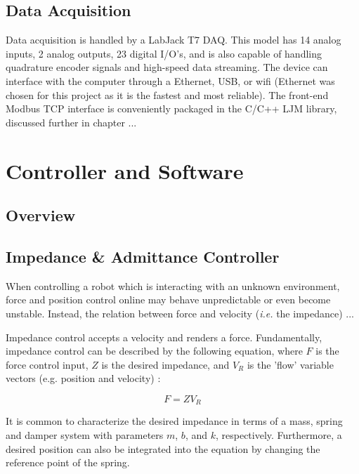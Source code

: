 \documentclass[12pt]{report}
\begin{document}
	\section{Data Acquisition} 

	Data acquisition is handled by a LabJack T7 DAQ. This model has 14 analog inputs, 2 analog outputs, 23 digital I/O's, and is also capable of handling quadrature encoder signals and high-speed data streaming. The device can interface with the computer through a Ethernet, USB, or wifi (Ethernet was chosen for this project as it is the fastest and most reliable). The front-end Modbus TCP interface is conveniently packaged in the C/C++ LJM library, discussed further in chapter ... 

\chapter{Controller and Software}

	\section{Overview}
	\section{Impedance \& Admittance Controller}

%

When controlling a robot which is interacting with an unknown environment, force and position control online may behave unpredictable or even become unstable. Instead, the relation between force and velocity (\textit{i.e.} the impedance) ...


Impedance control accepts a velocity and renders a force. Fundamentally, impedance control can be described by the following equation, where $F$ is the force control input, $Z$ is the desired impedance, and $V_R$ is the 'flow' variable vectors (e.g. position and velocity) :

\begin{equation}
	F = ZV_R 
\end{equation} 

It is common to characterize the desired impedance in terms of a mass, spring and damper system with parameters $m$, $b$, and $k$, respectively. Furthermore, a desired position can also be integrated into the equation by changing the reference point of the spring. 
\end{document}
